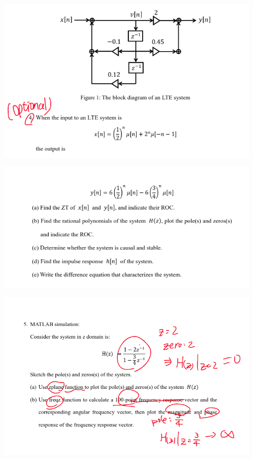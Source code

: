 \documentclass[a4paper]{article}
\begin{document}
	
	
	\begin{center}
		\includegraphics[width=1\linewidth]{screenshot040}
	\end{center}
	
	\begin{center}
		\includegraphics[width=1\linewidth]{screenshot041}
	\end{center}
	
	
	\begin{center}
		\includegraphics[width=1\linewidth]{screenshot042}
	\end{center}
	
\end{document}
